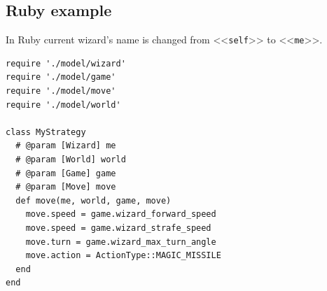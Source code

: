 \newpage
\subsection{Ruby example}

In Ruby current wizard's name is changed from <<\texttt{self}>> to <<\texttt{me}>>.

\begin{verbatim}
require './model/wizard'
require './model/game'
require './model/move'
require './model/world'

class MyStrategy
  # @param [Wizard] me
  # @param [World] world
  # @param [Game] game
  # @param [Move] move
  def move(me, world, game, move)
    move.speed = game.wizard_forward_speed
    move.speed = game.wizard_strafe_speed
    move.turn = game.wizard_max_turn_angle
    move.action = ActionType::MAGIC_MISSILE
  end
end
\end{verbatim}
